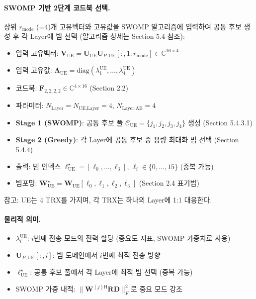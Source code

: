 \documentclass[10pt]{article}
\begin{document}
\paragraph{SWOMP 기반 2단계 코드북 선택.}
상위 $r_{\text{mode}}$ (=4)개 고유벡터와 고유값을 SWOMP 알고리즘에 입력하여 공통 후보 생성 후 각 Layer에 빔 선택 (알고리즘 상세는 Section 5.4 참조):
\begin{itemize}
    \item 입력 고유벡터: $\mathbf{V}_{\text{UE}} = \mathbf{U}_{\text{UE}} \mathbf{U}_{P,\text{UE}}[:, 1:r_{\text{mode}}] \in \mathbb{C}^{16 \times 4}$
    \item 입력 고유값: $\boldsymbol{\Lambda}_{\text{UE}} = \text{diag}(\lambda_1^{\text{UE}}, \ldots, \lambda_4^{\text{UE}})$
    \item 코드북: $\mathbf{F}_{2,2,2,2} \in \mathbb{C}^{4 \times 16}$ (Section 2.2)
    \item 파라미터: $N_{\text{Layer}} = N_{\text{UE,Layer}} = 4$, $N_{\text{Layer,AE}} = 4$
    \item \textbf{Stage 1 (SWOMP)}: 공통 후보 풀 $\mathcal{C}_{\text{UE}} = \{j_1, j_2, j_3, j_4\}$ 생성 (Section 5.4.3.1)
    \item \textbf{Stage 2 (Greedy)}: 각 Layer에 공통 후보 중 용량 최대화 빔 선택 (Section 5.4.4)
    \item 출력: 빔 인덱스 $\boldsymbol{\ell}_{\text{UE}}^{\star} = [\ell_0, \ldots, \ell_3]$, $\ell_i \in \{0, \ldots, 15\}$ (중복 가능)
    \item 빔포밍: $\mathbf{W}_{\text{UE}}^{\star} = \mathbf{W}_{\text{UE}}[\ell_0, \ell_1, \ell_2, \ell_3]$ (Section 2.4 표기법)
\end{itemize}

참고: UE는 4 TRX를 가지며, 각 TRX는 하나의 Layer에 1:1 대응한다.

\paragraph{물리적 의미.}
\begin{itemize}
    \item $\lambda_i^{\text{UE}}$: $i$번째 전송 모드의 전력 할당 (중요도 지표, SWOMP 가중치로 사용)
    \item $\mathbf{U}_{P,\text{UE}}[:, i]$: 빔 도메인에서 $i$번째 최적 전송 방향
    \item $\boldsymbol{\ell}_{\text{UE}}^{\star}$: 공통 후보 풀에서 각 Layer에 최적 빔 선택 (중복 가능)
    \item SWOMP 가중 내적: $\|\mathbf{W}^{(j)\mathsf{H}} \mathbf{R} \mathbf{D}\|_F^2$로 중요 모드 강조
\end{itemize}
\end{document}
